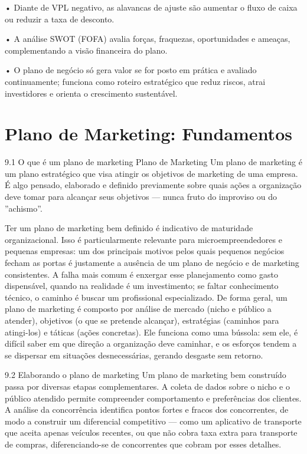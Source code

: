 • Diante de VPL negativo, as alavancas de ajuste são aumentar o fluxo de caixa ou reduzir a taxa de desconto.

• A análise SWOT (FOFA) avalia forças, fraquezas, oportunidades e ameaças, complementando a visão financeira do plano.

• O plano de negócio só gera valor se for posto em prática e avaliado continuamente; funciona como roteiro estratégico que reduz riscos, atrai investidores e orienta o crescimento sustentável.

\chapter{Plano de Marketing: Fundamentos}

9.1 O que é um plano de marketing Plano de Marketing Um plano de marketing é um plano estratégico que visa atingir os objetivos de marketing de uma empresa. É algo pensado, elaborado e definido previamente sobre quais ações a organização deve tomar para alcançar seus objetivos — nunca fruto do improviso ou do ”achismo”.

Ter um plano de marketing bem definido é indicativo de maturidade organizacional. Isso é particularmente relevante para microempreendedores e pequenas empresas: um dos principais motivos pelos quais pequenos negócios fecham as portas é justamente a ausência de um plano de negócio e de marketing consistentes. A falha mais comum é enxergar esse planejamento como gasto dispensável, quando na realidade é um investimento; se faltar conhecimento técnico, o caminho é buscar um profissional especializado. De forma geral, um plano de marketing é composto por análise de mercado (nicho e público a atender), objetivos (o que se pretende alcançar), estratégias (caminhos para atingi-los) e táticas (ações concretas). Ele funciona como uma bússola: sem ele, é difícil saber em que direção a organização deve caminhar, e os esforços tendem a se dispersar em situações desnecessárias, gerando desgaste sem retorno.

9.2 Elaborando o plano de marketing Um plano de marketing bem construído passa por diversas etapas complementares. A coleta de dados sobre o nicho e o público atendido permite compreender comportamento e preferências dos clientes. A análise da concorrência identifica pontos fortes e fracos dos concorrentes, de modo a construir um diferencial competitivo — como um aplicativo de transporte que aceita apenas veículos recentes, ou que não cobra taxa extra para transporte de compras, diferenciando-se de concorrentes que cobram por esses detalhes.

